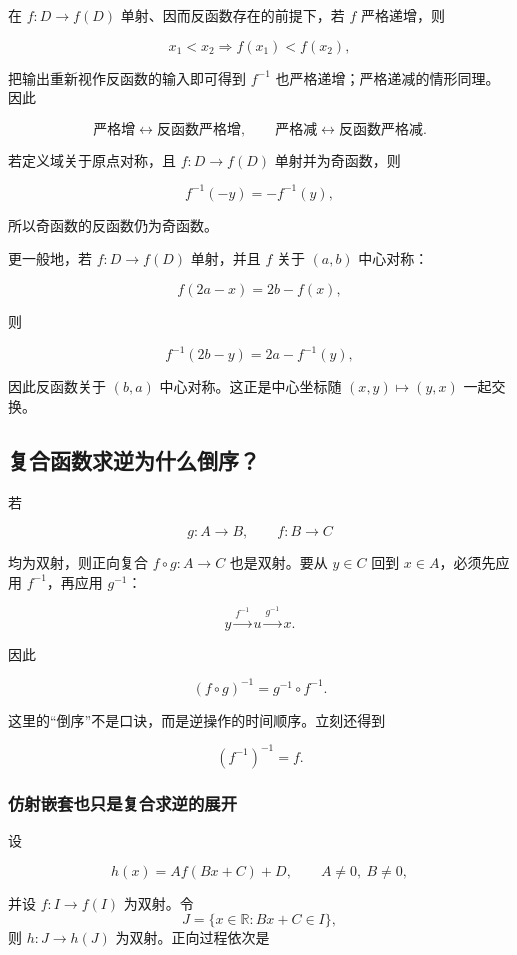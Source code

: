\documentclass[11pt,a4paper]{ctexart}
\begin{document}
在 \(f:D\to f(D)\) 单射、因而反函数存在的前提下，若 \(f\) 严格递增，则

\[
x_1<x_2
\Longrightarrow
f(x_1)<f(x_2),
\]

把输出重新视作反函数的输入即可得到 \(f^{-1}\) 也严格递增；严格递减的情形同理。因此

\[
\boxed{
\text{严格增}\leftrightarrow\text{反函数严格增},
\qquad
\text{严格减}\leftrightarrow\text{反函数严格减}.
}
\]

若定义域关于原点对称，且 \(f:D\to f(D)\) 单射并为奇函数，则

\[
f^{-1}(-y)=-f^{-1}(y),
\]

所以奇函数的反函数仍为奇函数。

更一般地，若 \(f:D\to f(D)\) 单射，并且 \(f\) 关于 \((a,b)\) 中心对称：

\[
f(2a-x)=2b-f(x),
\]

则

\[
f^{-1}(2b-y)=2a-f^{-1}(y),
\]

因此反函数关于 \((b,a)\) 中心对称。这正是中心坐标随
\((x,y)\mapsto(y,x)\) 一起交换。

\subsection{复合函数求逆为什么倒序？}

若

\[
g:A\to B,\qquad f:B\to C
\]

均为双射，则正向复合 \(f\circ g:A\to C\) 也是双射。要从 \(y\in C\) 回到 \(x\in A\)，必须先应用 \(f^{-1}\)，再应用 \(g^{-1}\)：

\[
y\xrightarrow{f^{-1}}u\xrightarrow{g^{-1}}x.
\]

因此

\[
\boxed{
(f\circ g)^{-1}=g^{-1}\circ f^{-1}.
}
\]

这里的``倒序''不是口诀，而是逆操作的时间顺序。立刻还得到

\[
\boxed{(f^{-1})^{-1}=f.}
\]

\subsubsection{仿射嵌套也只是复合求逆的展开}

设

\[
h(x)=A f(Bx+C)+D,
\qquad A\ne0,\ B\ne0,
\]

并设 \(f:I\to f(I)\) 为双射。令
\[
J=\{x\in\mathbb R:Bx+C\in I\},
\]
则 \(h:J\to h(J)\) 为双射。正向过程依次是
\end{document}
